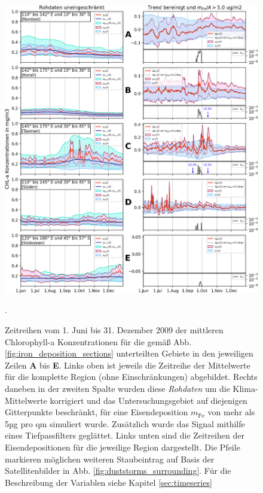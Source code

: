 \documentclass[12pt,a4paper,onecolumn,draft]{scrartcl}
\begin{document}
\begin{figure}
\includegraphics[width=\textwidth]{bilder/timeseries_all.png}
\caption{Zeitreihen vom 1. Juni bis 31. Dezember 2009 der mittleren Chlorophyll-a Konzentrationen für die gemäß Abb. \ref{fig:iron_deposition_sections} unterteilten Gebiete in den jeweiligen Zeilen \textbf{A} bis \textbf{E}. Links oben ist jeweils die Zeitreihe der Mittelwerte für die komplette Region (ohne Einschränkungen) abgebildet. Rechts daneben in der zweiten Spalte wurden diese \textit{Rohdaten} um die Klima-Mittelwerte korrigiert und das Untersuchungsgebiet auf diejenigen Gitterpunkte beschränkt, für eine Eisendeposition $m_\text{Fe}$ von mehr als 5µg pro qm simuliert wurde. Zusätzlich wurde das Signal mithilfe eines Tiefpassfilters geglättet. Links unten sind die Zeitreihen der Eisendepositionen für die jeweilige Region dargestellt. Die Pfeile markieren möglichen weiteren Staubeintrag auf Basis der Satellitenbilder in Abb. \ref{fig:duststorms_surrounding}. Für die Beschreibung der Variablen siehe Kapitel \ref{sec:timeseries}}. \label{fig:timeseries_full}
\end{figure}
\end{document}
